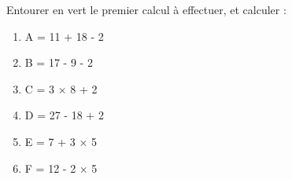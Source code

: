 
\begin{exercice}\label{exosmath-0728}

    Entourer en vert le premier calcul à effectuer, et calculer :
    \begin{multicols}{2}
        \begin{enumerate}
\item
A = 11 + 18 - 2
\item
B = 17 - 9 - 2
\item
C = 3 × 8 + 2
\item
D = 27 - 18 + 2
\item
E = 7 + 3 × 5
\item
F = 12 - 2 × 5
        \end{enumerate}
    \end{multicols}

\end{exercice}
